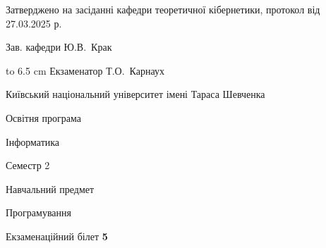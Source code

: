 \documentclass[12pt, ukrainian]{article}
\begin{document}
{\smallskip\smallskip \begin {scriptsize} Затверджено на засіданні кафедри теоретичної кібернетики, протокол   від   27.03.2025 р.\par\smallskip\smallskip\smallskip\smallskip
{\parbox {6.5 cm} {Зав. кафедри \dotfill Ю.В.~Крак}}\hspace {0.7cm} {\hbox to 6.5 cm { Екзаменатор \dotfill Т.О.~Карнаух}} \end{scriptsize}}
\newpage
{{\begin {scriptsize}\par
{ \center  Київський національний університет імені Тараса Шевченка \par}
{\parbox {5 cm}{Освітня програма \hfill}{\parbox {7 cm}{Інформатика\hfill}}\parbox {6 cm}{\hfill Семестр 2}}\par
{\parbox {5 cm} {Навчальний предмет \hfill}\parbox {7 cm}{Програмування \hfill}\parbox {6cm}{\hfill}\par}\vspace{-15pt} \end{scriptsize}}{\center Екзаменаційний білет \No \textbf { 5 }\par}}
\end{document}
